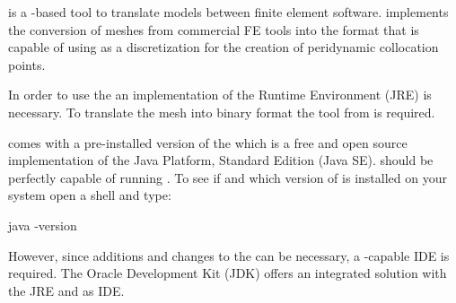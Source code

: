 % 
%               
%          
% 

\marktool{\fetranslatorname} is a \marktool{\javaname}-based tool to translate models between finite element software. \marktool{\fetranslatorname} implements the conversion of meshes from commercial FE tools into the format that \marktool{\toolname} is capable of using as a discretization for the creation of peridynamic collocation points.

In order to use the \marktool{\fetranslatorname} an implementation of the \marktool{\javaname} Runtime Environment (JRE) is necessary. To translate the mesh into binary format the tool \marktool{\ncgenname} from \marktool{\netcdfname} is required.



\marktool{\opensusename} comes with a pre-installed version of the  which is a free and open source implementation of the Java Platform, Standard Edition (Java SE).  should be perfectly capable of running \marktool{\fetranslatorname}. To see if and which version of \marktool{\javaname} is installed on your system open a shell and type:

\begin{code}
java -version
\end{code}

However, since additions and changes to the \marktool{\fetranslatorname} can be necessary, a \marktool{\javaname}-capable IDE is required. The Oracle \marktool{\javaname} Development Kit (JDK) offers an integrated solution with the JRE and \marktool{\netbeansname} as IDE.



